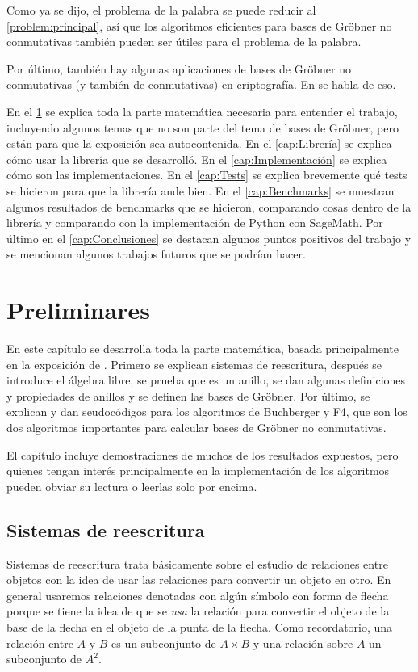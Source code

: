 \documentclass[12pt]{report}
\theoremstyle{customstyle}
\theoremstyle{factstyle}
\begin{document}
Como ya se dijo, el problema de la palabra se puede reducir al \cref{problem:principal}, así que los algoritmos eficientes para bases de Gröbner no conmutativas también pueden ser útiles para el problema de la palabra.

Por último, también hay algunas aplicaciones de bases de Gröbner no conmutativas (y también de conmutativas) en criptografía. En \cite{article:crypto_gb} se habla de eso.

En el \cref{cap:Preliminares} se explica toda la parte matemática necesaria para entender el trabajo, incluyendo algunos temas que no son parte del tema de bases de Gröbner, pero están para que la exposición sea autocontenida. En el \cref{cap:Librería} se explica cómo usar la librería que se desarrolló. En el \cref{cap:Implementación} se explica cómo son las implementaciones. En el \cref{cap:Tests} se explica brevemente qué tests se hicieron para que la librería ande bien. En el \cref{cap:Benchmarks} se muestran algunos resultados de benchmarks que se hicieron, comparando cosas dentro de la librería y comparando con la implementación de Python con SageMath. Por último en el \cref{cap:Conclusiones} se destacan algunos puntos positivos del trabajo y se mencionan algunos trabajos futuros que se podrían hacer.

\chapter{Preliminares}\label{cap:Preliminares}

En este capítulo se desarrolla toda la parte matemática, basada principalmente en la exposición de \cite{thesis:Hof20}. Primero se explican sistemas de reescritura, después se introduce el álgebra libre, se prueba que es un anillo, se dan algunas definiciones y propiedades de anillos y se definen las bases de Gröbner. Por último, se explican y dan seudocódigos para los algoritmos de Buchberger y F4, que son los dos algoritmos importantes para calcular bases de Gröbner no conmutativas.

El capítulo incluye demostraciones de muchos de los resultados expuestos, pero quienes tengan interés principalmente en la implementación de los algoritmos pueden obviar su lectura o leerlas solo por encima.

\section{Sistemas de reescritura}

Sistemas de reescritura trata básicamente sobre el estudio de relaciones entre objetos con la idea de usar las relaciones para convertir un objeto en otro. En general usaremos relaciones denotadas con algún símbolo con forma de flecha porque se tiene la idea de que se \textsl{usa} la relación para convertir el objeto de la base de la flecha en el objeto de la punta de la flecha. Como recordatorio, una relación entre $A$ y $B$ es un subconjunto de $A × B$ y una relación sobre $A$ un subconjunto de $A^2$.
\end{document}
